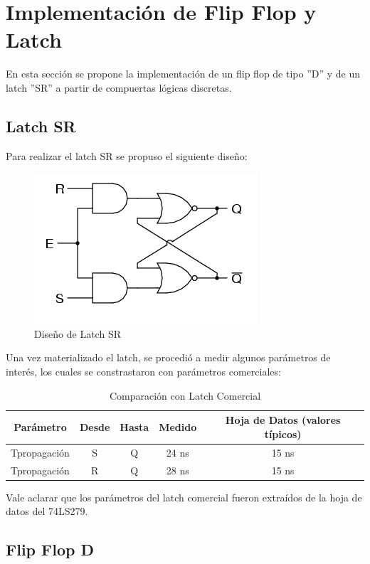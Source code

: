 \section{Implementación de Flip Flop y Latch}

En esta sección se propone la implementación de un flip flop de tipo
''D'' y de un latch ''SR'' a partir de compuertas lógicas discretas.

\subsection{Latch SR}

Para realizar el latch SR se propuso el siguiente diseño:

\begin{figure}[H]
\centering
\includegraphics[scale=0.5]{./circuitoLATCH.PNG}
\caption{Diseño de Latch SR}
\end{figure}

Una vez materializado el latch, se procedió a medir algunos parámetros
de interés, los cuales se constrastaron con parámetros comerciales:

\begin{table}[H]
    \centering
\begin{tabular}{|c|c|c|c|c|}
\hline 
Parámetro & Desde & Hasta & Medido & Hoja de Datos (valores típicos)\tabularnewline
\hline 
\hline 
Tpropagación & S & Q & 24 ns & 15 ns\tabularnewline
\hline 
Tpropagación & R & Q & 28 ns & 15 ns\tabularnewline
\hline 
\end{tabular}

\caption{Comparación con Latch Comercial}
\end{table}

Vale aclarar que los parámetros del latch comercial fueron extraídos
de la hoja de datos del 74LS279.

\subsection{Flip Flop D}

